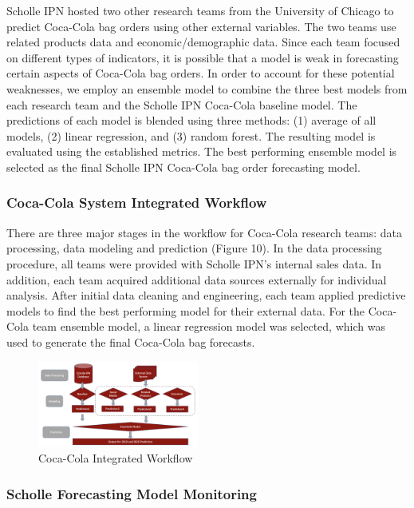 \documentclass[12pt,oneside]{chicagocapstone}
\begin{document}
Scholle IPN hosted two other research teams from the University of Chicago to predict Coca-Cola bag orders using other external variables. The two teams use related products data and economic/demographic data. Since each team focused on different types of indicators, it is possible that a model is weak in forecasting certain aspects of Coca-Cola bag orders. In order to account for these potential weaknesses, we employ an ensemble model to combine the three best models from each research team and the Scholle IPN Coca-Cola baseline model. The predictions of each model is blended using three methods: (1) average of all models, (2) linear regression, and (3) random forest. The resulting model is evaluated using the established metrics. The best performing ensemble model is selected as the final Scholle IPN Coca-Cola bag order forecasting model.

\hypertarget{coca-cola-system-integrated-workflow}{%
\subsubsection*{Coca-Cola System Integrated Workflow}\label{coca-cola-system-integrated-workflow}}

There are three major stages in the workflow for Coca-Cola research teams: data processing, data modeling and prediction (Figure 10). In the data processing procedure, all teams were provided with Scholle IPN's internal sales data. In addition, each team acquired additional data sources externally for individual analysis. After initial data cleaning and engineering, each team applied predictive models to find the best performing model for their external data. For the Coca-Cola team ensemble model, a linear regression model was selected, which was used to generate the final Coca-Cola bag forecasts.
\begin{figure}

{\centering \includegraphics[width=200px,angle = 0, scale=2.1]{figure/integrated_workflow} 

}

\caption{Coca-Cola Integrated Workflow}\label{fig:GoogleTrends3}
\end{figure}
\hypertarget{scholle-forecasting-model-monitoring}{%
\subsubsection*{Scholle Forecasting Model Monitoring}\label{scholle-forecasting-model-monitoring}}
\end{document}
